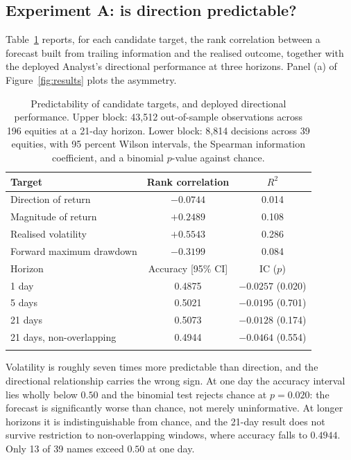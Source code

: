 \documentclass[pdflatex,sn-apa]{sn-jnl}%
\theoremstyle{thmstyleone}%
\theoremstyle{thmstyletwo}%
\theoremstyle{thmstylethree}%
\begin{document}
\subsection{Experiment A: is direction predictable?}\label{subsec:eval-direction}

Table~\ref{tab:analyst} reports, for each candidate target, the rank
correlation between a forecast built from trailing information and the realised
outcome, together with the deployed Analyst's directional performance at three
horizons. Panel (a) of Figure~\ref{fig:results} plots the asymmetry.

\begin{table}[h]
\caption{Predictability of candidate targets, and deployed directional
performance. Upper block: 43,512 out-of-sample observations across 196 equities
at a 21-day horizon. Lower block: 8,814 decisions across 39 equities, with 95
percent Wilson intervals, the Spearman information coefficient, and a binomial
$p$-value against chance.}\label{tab:analyst}%
\begin{tabular*}{\textwidth}{@{\extracolsep\fill}lcc@{}}
\toprule
Target & Rank correlation & $R^2$ \\
\midrule
Direction of return          & $-0.0744$ & 0.014 \\
Magnitude of return          & $+0.2489$ & 0.108 \\
Realised volatility          & $+0.5543$ & 0.286 \\
Forward maximum drawdown     & $-0.3199$ & 0.084 \\
\midrule
Horizon & Accuracy [95\% CI] & IC \quad ($p$) \\
\midrule
1 day    & 0.4875 \enskip [0.4771, 0.4980] & $-0.0257$ \enskip (0.020) \\
5 days   & 0.5021 \enskip [0.4916, 0.5126] & $-0.0195$ \enskip (0.701) \\
21 days  & 0.5073 \enskip [0.4968, 0.5178] & $-0.0128$ \enskip (0.174) \\
21 days, non-overlapping & 0.4944 \enskip [0.4763, 0.5125] & $-0.0464$ \enskip (0.554) \\
\botrule
\end{tabular*}
\end{table}

Volatility is roughly seven times more predictable than direction, and the
directional relationship carries the wrong sign. At one day the accuracy
interval lies wholly below $0.50$ and the binomial test rejects chance at
$p=0.020$: the forecast is significantly worse than chance, not merely
uninformative. At longer horizons it is indistinguishable from chance, and the
21-day result does not survive restriction to non-overlapping windows, where
accuracy falls to $0.4944$. Only 13 of 39 names exceed $0.50$ at one day.
\end{document}
